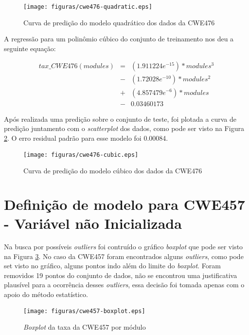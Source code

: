 \begin{figure}[h]
  \centering
  \texttt{[image: figuras/cwe476-quadratic.eps]}
      \caption{Curva de predição do modelo quadrático dos dados da CWE476}
  \label{fig:cwe476-quadratic}
\end{figure}

A regressão para um polinômio cúbico do conjunto de treinamento nos deu a
seguinte equação:

\begin{align*}
 tax\_CWE476(modules) &=& (1.911224e^{-15}) * modules^{3} \\
                      &-& (1.72028e^{-10}) * modules^{2} \\
                      &+& (4.857479e^{-6}) * modules \\
                      &-& 0.03460173
\end{align*}

Após realizada uma predição sobre o conjunto de teste, foi plotada a curva de
predição juntamento com o \textit{scatterplot} dos dados, como pode ser visto na
Figura \ref{fig:cwe476-cubic}. O erro residual padrão para esse modelo foi
0.00084.

\begin{figure}[h]
  \centering
  \texttt{[image: figuras/cwe476-cubic.eps]}
      \caption{Curva de predição do modelo cúbico dos dados da CWE476}
  \label{fig:cwe476-cubic}
\end{figure}


\section{Definição de modelo para CWE457 - Variável não Inicializada}

Na busca por possíveis \textit{outliers} foi contruído o gráfico
\textit{boxplot} que pode ser visto na Figura \ref{fig:cwe457-boxplot}. No caso
da CWE457 foram encontrados alguns \textit{outliers}, como pode set visto no
gráfico, alguns pontos indo além do limite do \textit{boxplot}. Foram removidos
19 pontos do conjunto de dados, não se encontrou uma justificativa plausível
para a ocorrência desses \textit{outliers}, essa decisão foi tomada apenas com o
apoio do método estatístico.

\begin{figure}[h]
  \centering
  \texttt{[image: figuras/cwe457-boxplot.eps]}
      \caption{\textit{Boxplot} da taxa da CWE457 por módulo}
  \label{fig:cwe457-boxplot}
\end{figure}

